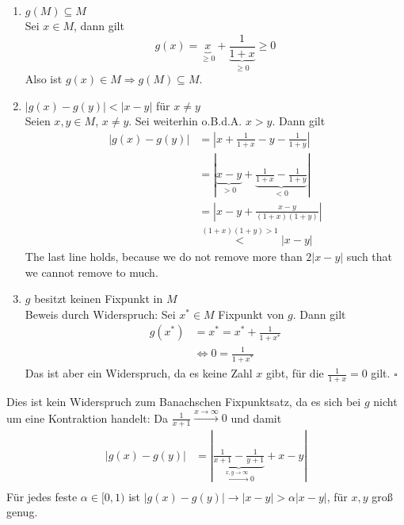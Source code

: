 \documentclass[11pt,a4paper,ngerman]{article}
\begin{document}
\begin{enumerate}
\item $g(M) \subseteq M$\\
  Sei $x \in M$, dann gilt 
  \begin{equation*}
    g(x) = \underbrace{x}_{\geq 0} + \underbrace{\frac{1}{1+x}}_{\geq 0} \geq 0
  \end{equation*}
  Also ist $g(x) \in M \Rightarrow g(M) \subseteq M$.
\item $|g(x) - g(y)| < |x-y|$ für $x \neq y$\\
  Seien $x,y \in M$, $x \neq y$. Sei weiterhin o.B.d.A. $x > y$. Dann gilt
  \begin{equation*}\begin{split}
    |g(x) - g(y)| &= |x + \frac{1}{1+x} - y - \frac{1}{1+y}|\\
                  &= |\underbrace{x - y}_{> 0} + \underbrace{\frac{1}{1+x} - \frac{1}{1+y}}_{< 0}| \\
                  &= \left| x - y +\frac{x-y}{(1+x)(1+y)} \right|\\
                  &\overset{(1+x)(1+y) > 1}{<} |x - y|
  \end{split}\end{equation*}
    The last line holds, because we do not remove more than $2|x-y|$ such that we cannot remove to much.
\item $g$ besitzt keinen Fixpunkt in $M$\\
  Beweis durch Widerspruch: Sei $x^* \in M$ Fixpunkt von $g$. Dann gilt
  \begin{equation*}\begin{split}
    g(x^*) &= x^* = x^* + \frac{1}{1+ x^*}\\
    &\Leftrightarrow 0 = \frac{1}{1 + x^*}
  \end{split}\end{equation*}
  Das ist aber ein Widerspruch, da es keine Zahl $x$ gibt, für die $\frac{1}{1+x} = 0$ gilt.
  \mbox{} \hfill $\square$
\end{enumerate}
Dies ist kein Widerspruch zum Banachschen Fixpunktsatz, da es sich bei $g$ nicht um eine
Kontraktion handelt: Da $\frac{1}{x+1} \stackrel{x \to \infty}{\to} 0$ und damit
\begin{equation*}\begin{split}
|g(x) - g(y)| &= |\underbrace{\frac{1}{x+1} - \frac{1}{y+1}}_{\stackrel{x,y \to \infty}{\to} 0}  + x- y| \\
\end{split}\end{equation*} 
Für jedes feste $\alpha \in [0,1)$ ist $|g(x) - g(y)| \to |x-y| > \alpha|x-y|$, für $x,y$ groß genug.
\end{document}

